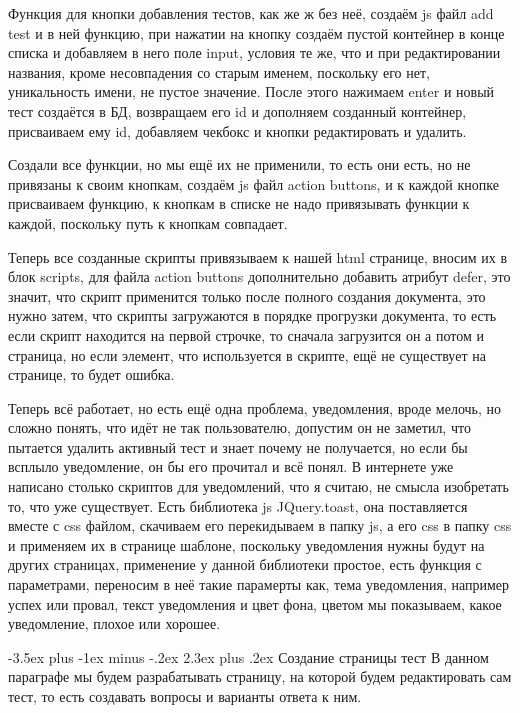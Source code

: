 \documentclass[12pt, oldlfont, amsfonts]{report}
\makeatletter
\renewcommand{\section}{\@startsection{section}{1}{0pt}%
                                {-3.5ex plus -1ex minus -.2ex}%
                                {2.3ex plus .2ex}%
{\centering\hyphenpenalty=10000\normalfont\Large\bfseries}}
\makeatother
\begin{document}
Функция для кнопки добавления тестов, как же ж без неё, создаём js файл { add test} и в ней функцию, при нажатии на кнопку создаём пустой контейнер в конце списка и добавляем в него поле input, условия те же, что и при редактировании названия, кроме несовпадения со старым именем, поскольку его нет, уникальность имени, не пустое значение. После этого нажимаем {enter} и новый тест создаётся в БД, возвращаем его id и дополняем созданный контейнер, присваиваем ему id, добавляем чекбокс и кнопки редактировать и удалить.

Создали все функции, но мы ещё их не применили, то есть они есть, но не привязаны к своим кнопкам, создаём js файл {action buttons}, и к каждой кнопке присваиваем функцию, к кнопкам в списке не надо привязывать функции к каждой, поскольку путь к кнопкам совпадает.

Теперь все созданные скрипты привязываем к нашей html странице, вносим их в блок { scripts}, для файла { action buttons} дополнительно добавить атрибут defer, это значит, что скрипт применится только после полного создания документа, это нужно затем, что скрипты загружаются в порядке прогрузки документа, то есть если скрипт находится на первой строчке, то сначала загрузится он а потом и страница, но если элемент, что используется в скрипте, ещё не существует на странице, то будет ошибка.

Теперь всё работает, но есть ещё одна проблема, уведомления, вроде мелочь, но сложно понять, что идёт не так пользователю, допустим он не заметил, что пытается удалить активный тест и знает почему не получается, но если бы всплыло уведомление, он бы его прочитал и всё понял. В интернете уже написано столько скриптов для уведомлений, что я считаю, не смысла изобретать то, что уже существует. Есть библиотека js { JQuery.toast}, она поставляется вместе с css файлом, скачиваем его перекидываем в папку js, а его css в папку css и применяем их в странице шаблоне, поскольку уведомления нужны будут на других страницах, применение у данной библиотеки простое, есть функция с параметрами, переносим в неё такие парамерты как, тема уведомления, например успех или провал, текст уведомления и цвет фона, цветом мы показываем, какое уведомление, плохое или хорошее.



\section{Создание страницы тест}
В данном параграфе мы будем разрабатывать страницу, на которой будем редактировать сам тест, то есть создавать вопросы и варианты ответа к ним.
\end{document}
